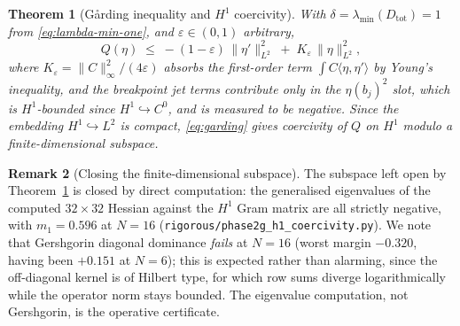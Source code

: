 \documentclass[11pt]{amsart}
\theoremstyle{plain}
\newtheorem{theorem}{Theorem}
\theoremstyle{definition}
\newtheorem{remark}[theorem]{Remark}
\begin{document}
\begin{theorem}[G\aa rding inequality and $H^{1}$
coercivity]\label{thm:garding}
With $\delta = \lambda_{\min}(D_{\mathrm{tot}}) = 1$ from
\eqref{eq:lambda-min-one}, and $\varepsilon\in(0,1)$ arbitrary,
\begin{equation}\label{eq:garding}
   Q(\eta) \;\leq\; -(1-\varepsilon)\,\|\eta'\|^{2}_{L^{2}}
                    \;+\; K_{\varepsilon}\,\|\eta\|^{2}_{L^{2}} ,
\end{equation}
where $K_{\varepsilon} = \|C\|_{\infty}^{2}/(4\varepsilon)$ absorbs the
first-order term $\int C\langle\eta,\eta'\rangle$ by Young's
inequality, and the breakpoint jet terms contribute only in the
$\eta(b_{j})^{2}$ slot, which is $H^{1}$-bounded since
$H^{1}\hookrightarrow C^{0}$, and is measured to be negative.  Since
the embedding $H^{1}\hookrightarrow L^{2}$ is compact,
\eqref{eq:garding} gives coercivity of $Q$ on $H^{1}$ modulo a
finite-dimensional subspace.
\end{theorem}

\begin{remark}[Closing the finite-dimensional subspace]
\label{rem:closing}
The subspace left open by Theorem~\ref{thm:garding} is closed by
direct computation: the generalised eigenvalues of the computed
$32\times32$ Hessian against the $H^{1}$ Gram matrix are all strictly
negative, with $m_{1} = 0.596$ at $N=16$
(\texttt{rigorous/phase2g\_h1\_coercivity.py}).  We note that
Gershgorin diagonal dominance \emph{fails} at $N=16$ (worst margin
$-0.320$, having been $+0.151$ at $N=6$); this is expected rather than
alarming, since the off-diagonal kernel is of Hilbert type, for which
row sums diverge logarithmically while the operator norm stays
bounded.  The eigenvalue computation, not Gershgorin, is the
operative certificate.
\end{remark}
\end{document}
